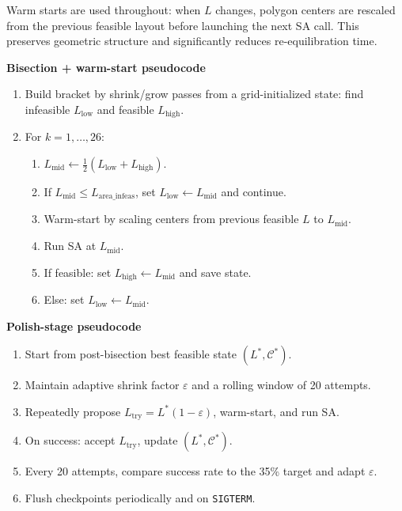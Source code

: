 \documentclass[10pt]{article}
\begin{document}
Warm starts are used throughout: when $L$ changes, polygon centers are rescaled
from the previous feasible layout before launching the next SA call.
This preserves geometric structure and significantly reduces re-equilibration time.

\textbf{Bisection + warm-start pseudocode}
\begin{enumerate}[leftmargin=1.2em]
  \item Build bracket by shrink/grow passes from a grid-initialized state:
        find infeasible $L_{\mathrm{low}}$ and feasible $L_{\mathrm{high}}$.
  \item For $k=1,\dots,26$:
    \begin{enumerate}[leftmargin=1.4em]
      \item $L_{\mathrm{mid}}\leftarrow \tfrac{1}{2}(L_{\mathrm{low}}+L_{\mathrm{high}})$.
      \item If $L_{\mathrm{mid}} \le L_{\mathrm{area\_infeas}}$, set
            $L_{\mathrm{low}}\leftarrow L_{\mathrm{mid}}$ and continue.
      \item Warm-start by scaling centers from previous feasible $L$ to $L_{\mathrm{mid}}$.
      \item Run SA at $L_{\mathrm{mid}}$.
      \item If feasible: set $L_{\mathrm{high}}\leftarrow L_{\mathrm{mid}}$ and save state.
      \item Else: set $L_{\mathrm{low}}\leftarrow L_{\mathrm{mid}}$.
    \end{enumerate}
\end{enumerate}

\textbf{Polish-stage pseudocode}
\begin{enumerate}[leftmargin=1.2em]
  \item Start from post-bisection best feasible state $(L^*,\mathcal{C}^*)$.
  \item Maintain adaptive shrink factor $\varepsilon$ and a rolling window of 20 attempts.
  \item Repeatedly propose $L_{\mathrm{try}}=L^*(1-\varepsilon)$, warm-start, and run SA.
  \item On success: accept $L_{\mathrm{try}}$, update $(L^*,\mathcal{C}^*)$.
  \item Every 20 attempts, compare success rate to the 35\% target and adapt $\varepsilon$.
  \item Flush checkpoints periodically and on \texttt{SIGTERM}.
\end{enumerate}
\end{document}
